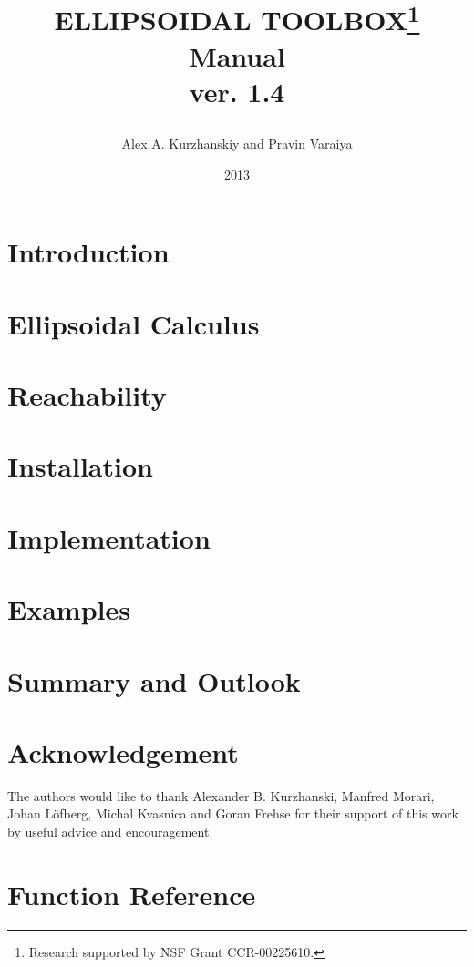 \documentclass{report}
\title{
\easyfigure[h][0.7\textwidth]{logo.eps}{}{}
ELLIPSOIDAL TOOLBOX\thanks{Research supported by NSF Grant CCR-00225610.}\\
Manual\\
\normalsize{ver. 1.4}
\author{Alex A. Kurzhanskiy and Pravin Varaiya}
\date{2013}
}
\begin{document}
\maketitle
\tableofcontents

\chapter{Introduction}\label{ch_intro}


\chapter{Ellipsoidal Calculus}\label{ch_ellcalc}


\chapter{Reachability}\label{ch_reachability}


\chapter{Installation}\label{ch_install}


\chapter{Implementation}\label{ch_implementation}


\chapter{Examples}\label{ch_examples}


\chapter{Summary and Outlook}\label{ch_summary}


\chapter*{Acknowledgement}
The authors would like to thank Alexander B. Kurzhanski,
Manfred Morari, Johan L{\"o}fberg, Michal Kvasnica and Goran Frehse
for their support of this work by useful advice and encouragement.



\appendix
\chapter{Function Reference}\label{appendix_a}

\end{document}
